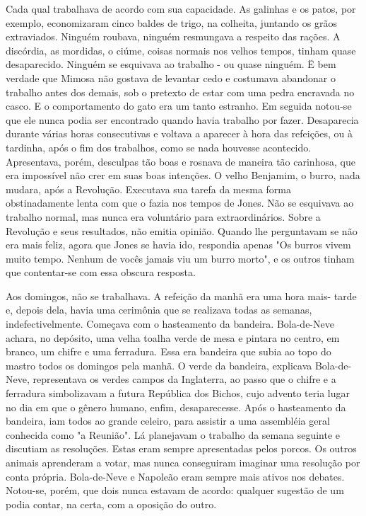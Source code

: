 Cada qual trabalhava de acordo com sua capacidade. As galinhas e os patos, por exemplo, economizaram
cinco baldes de trigo, na colheita, juntando os grãos extraviados. Ninguém roubava, ninguém
resmungava a respeito das rações. A discórdia, as mordidas, o ciúme, coisas normais nos velhos tempos,
tinham quase desaparecido. Ninguém se esquivava ao trabalho - ou quase ninguém. Ë bem verdade que
Mimosa não gostava de levantar cedo e costumava abandonar o trabalho antes dos demais, sob o pretexto
de estar com uma pedra encravada no casco. E o comportamento do gato era um tanto estranho. Em
seguida notou-se que ele nunca podia ser encontrado quando havia trabalho por fazer. Desaparecia
durante várias horas consecutivas e voltava a aparecer à hora das refeições, ou à tardinha, após o fim dos
trabalhos, como se nada houvesse acontecido. Apresentava, porém, desculpas tão boas e rosnava de
maneira tão carinhosa, que era impossível não crer em suas boas intenções. O velho Benjamim, o burro,
nada mudara, após a Revolução. Executava sua tarefa da mesma forma obstinadamente lenta com que o
fazia nos tempos de Jones. Não se esquivava ao trabalho normal, mas nunca era voluntário para
extraordinários. Sobre a Revolução e seus resultados, não emitia opinião. Quando lhe perguntavam se
não era mais feliz, agora que Jones se havia ido, respondia apenas "Os burros vivem muito tempo.
Nenhum de vocês jamais viu um burro morto", e os outros tinham que contentar-se com essa obscura
resposta.

Aos domingos, não se trabalhava. A refeição da manhã era uma hora mais- tarde e, depois dela, havia
uma cerimônia que se realizava todas as semanas, indefectivelmente. Começava com o hasteamento da
bandeira. Bola-de-Neve achara, no depósito, uma velha toalha verde de mesa e pintara no centro, em
branco, um chifre e uma ferradura. Essa era bandeira que subia ao topo do mastro todos os domingos
pela manhã. O verde da bandeira, explicava Bola-de-Neve, representava os verdes campos da Inglaterra,
ao passo que o chifre e a ferradura simbolizavam a futura República dos Bichos, cujo advento teria lugar
no dia em que o gênero humano, enfim, desaparecesse. Após o hasteamento da bandeira, iam todos ao
grande celeiro, para assistir a uma assembléia geral conhecida como "a Reunião". Lá planejavam o
trabalho da semana seguinte e discutiam as resoluções. Estas eram sempre apresentadas pelos porcos. Os
outros animais aprenderam a votar, mas nunca conseguiram imaginar uma resolução por conta própria.
Bola-de-Neve e Napoleão eram sempre mais ativos nos debates. Notou-se, porém, que dois nunca
estavam de acordo: qualquer sugestão de um podia contar, na certa, com a oposição do outro.

